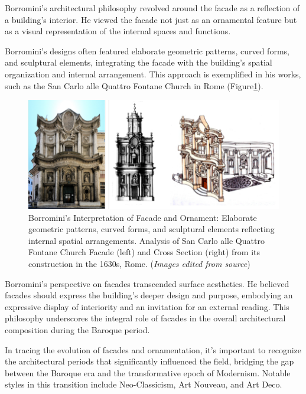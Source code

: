 Borromini's architectural philosophy revolved around the facade as a reflection of a building's interior.
He viewed the facade not just as an ornamental feature but as a visual representation of the internal spaces and functions\cite{Benjamin2006}.

Borromini's designs often featured elaborate geometric patterns, curved forms, and sculptural elements, integrating the facade with the building's spatial organization and internal arrangement.
This approach is exemplified in his works, such as the San Carlo alle Quattro Fontane Church in Rome (Figure\ref{fig:BorrominiArchitecture}).

    \begin{figure}[htb]
    \centering
    \includegraphics[width= \linewidth]{Images/BaroquefacadeBorromini}
    \caption{Borromini's Interpretation of Facade and Ornament: Elaborate geometric patterns, curved forms, and sculptural elements reflecting internal spatial arrangements. Analysis of San Carlo alle Quattro Fontane Church Facade (left) and Cross Section (right) from its construction in the 1630s, Rome. (\textit{Images edited from source})}
    \label{fig:BorrominiArchitecture}
    \end{figure}

Borromini's perspective on facades transcended surface aesthetics.
He believed facades should express the building's deeper design and purpose, embodying an expressive display of interiority and an invitation for an external reading\cite{Biglieri2004}.
This philosophy underscores the integral role of facades in the overall architectural composition during the Baroque period.


In tracing the evolution of facades and ornamentation, it's important to recognize the architectural periods that significantly influenced the field, bridging the gap between the Baroque era and the transformative epoch of Modernism.
Notable styles in this transition include Neo-Classicism, Art Nouveau, and Art Deco.

